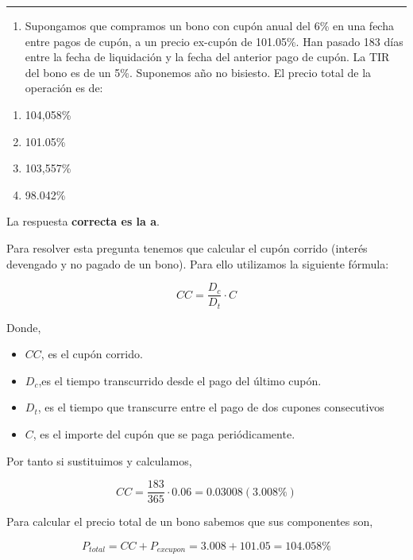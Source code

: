 \documentclass[
  letterpaper,
  DIV=11,
  numbers=noendperiod]{scrreprt}
\providecommand{\tightlist}{%
  \setlength{\itemsep}{0pt}\setlength{\parskip}{0pt}}\usepackage{longtable,booktabs,array}
\begin{document}
\begin{center}\rule{0.5\linewidth}{0.5pt}\end{center}

\begin{enumerate}
\def\labelenumi{\arabic{enumi}.}
\setcounter{enumi}{87}
\tightlist
\item
  Supongamos que compramos un bono con cupón anual del 6\% en una fecha
  entre pagos de cupón, a un precio ex-cupón de 101.05\%. Han pasado 183
  días entre la fecha de liquidación y la fecha del anterior pago de
  cupón. La TIR del bono es de un 5\%. Suponemos año no bisiesto. El
  precio total de la operación es de:
\end{enumerate}

\begin{enumerate}
\def\labelenumi{\alph{enumi})}
\item
  104,058\%
\item
  101.05\%
\item
  103,557\%
\item
  98.042\%
\end{enumerate}

\begin{tcolorbox}[enhanced jigsaw, left=2mm, opacityback=0, colback=white, breakable, arc=.35mm, bottomrule=.15mm, rightrule=.15mm, toprule=.15mm, leftrule=.75mm, colframe=quarto-callout-tip-color-frame]
\begin{minipage}[t]{5.5mm}
\textcolor{quarto-callout-tip-color}{\faLightbulb}
\end{minipage}%
\begin{minipage}[t]{\textwidth - 5.5mm}

La respuesta \textbf{correcta es la a}.

Para resolver esta pregunta tenemos que calcular el cupón corrido
(interés devengado y no pagado de un bono). Para ello utilizamos la
siguiente fórmula:

\[CC=\frac{D_c}{D_t}\cdot C\]

Donde,

\begin{itemize}
\item
  \(CC\), es el cupón corrido.
\item
  \(D_{c}\),es el tiempo transcurrido desde el pago del último cupón.
\item
  \(D_{t}\), es el tiempo que transcurre entre el pago de dos cupones
  consecutivos
\item
  \(C\), es el importe del cupón que se paga periódicamente.
\end{itemize}

Por tanto si sustituimos y calculamos,

\[CC=\frac{183}{365}\cdot 0.06=0.03008(3.008\%)\]

Para calcular el precio total de un bono sabemos que sus componentes
son,

\[P_{total}=CC+P_{excupon}=3.008+101.05=104.058\%\]

\end{minipage}%
\end{tcolorbox}
\end{document}
